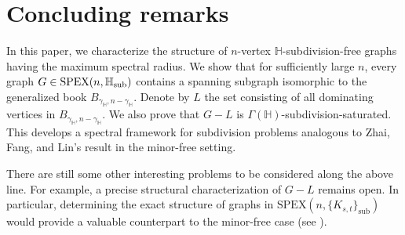 \documentclass[11pt, a4paper]{article}
\theoremstyle{definition}
\newcommand{\<}{\subseteq}
\begin{document}
\section{Concluding remarks}
In this paper, we characterize the structure of $n$-vertex  $\mathbb{H}$-subdivision-free graphs having the maximum spectral radius. We show that for sufficiently large $n$, every graph $G\in {\rm SPEX}(n,\mathbb{H}_{\rm sub})$ contains a spanning subgraph isomorphic to the generalized book $B_{\gamma_\mathbb{H},n-\gamma_\mathbb{H}}$. Denote by $L$ the set consisting of all  dominating vertices in $B_{\gamma_\mathbb{H},n-\gamma_\mathbb{H}}$. We also prove that $G-L$ is $\Gamma(\mathbb{H})$-subdivision-saturated. This develops a spectral framework for subdivision problems analogous to Zhai, Fang, and Lin's result  \cite{zhai} in the minor-free setting. %

There are still some other interesting problems to be considered along the above line. For example, a precise structural characterization of $G-L$ remains open. %
In particular, determining the exact structure of graphs in $\mathrm{SPEX}(n,\{K_{s,t}\}_{\mathrm{sub}})$ would provide a valuable counterpart to the minor-free case (see \cite{Tait2019,Tait2017,Zhai-minor}).




\end{document}
